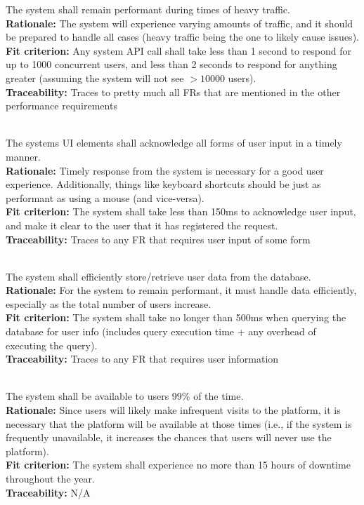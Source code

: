 \documentclass[12pt, titlepage]{article}
\newcounter{NFR_Counter}
\newcounter{FR_Counter}
\begin{document}
The system shall remain performant during times of heavy traffic.\\
\textbf{Rationale:}
The system will experience varying amounts of traffic, and it should be prepared to handle all cases (heavy traffic being the 
one to likely cause issues).\\
\textbf{Fit criterion:}
Any system API call shall take less than 1 second to respond for up to 1000 concurrent users, and less than 2 seconds to respond for anything 
greater (assuming the system will not see $>10000$ users).\\
\textbf{Traceability:}
Traces to pretty much all FRs that are mentioned in the other performance requirements \\~\\
\addtocounter{NFR_Counter}{1}

The systems UI elements shall acknowledge all forms of user input in a timely manner.\\
\textbf{Rationale:}
Timely response from the system is necessary for a good user experience. Additionally, things like keyboard
shortcuts should be just as performant as using a mouse (and vice-versa).\\
\textbf{Fit criterion:}
The system shall take less than 150ms to acknowledge user input, and make it clear to the user that it has registered the request.\\
\textbf{Traceability:}
Traces to any FR that requires user input of some form \\~\\
\addtocounter{NFR_Counter}{1}

The system shall efficiently store/retrieve user data from the database.\\
\textbf{Rationale:}
For the system to remain performant, it must handle data efficiently, especially as the total number of users increase.\\
\textbf{Fit criterion:}
The system shall take no longer than 500ms when querying the database for user info (includes query execution time + any overhead of executing 
the query).\\
\textbf{Traceability:}
Traces to any FR that requires user information \\~\\
\addtocounter{NFR_Counter}{1}

The system shall be available to users 99\% of the time.\\
\textbf{Rationale:}
Since users will likely make infrequent visits to the platform, it is necessary that the platform will be available at those 
times (i.e., if the system is frequently unavailable, it increases the chances that users will never use the platform).\\
\textbf{Fit criterion:}
The system shall experience no more than 15 hours of downtime throughout the year.\\
\textbf{Traceability:}
N/A
\addtocounter{NFR_Counter}{1}
\end{document}

